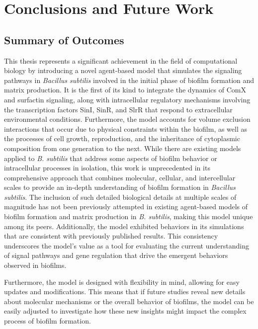 \chapter{Conclusions and Future Work}\label{chap:conclusion}

\section{Summary of Outcomes}\label{sec:summary_Ch7}
This thesis represents a significant achievement in the field of computational biology by introducing a novel agent-based model that simulates the signaling pathways in \textit{Bacillus subtilis} involved in the initial phase of biofilm formation and matrix production. It is the first of its kind to integrate the dynamics of ComX and surfactin signaling, along with intracellular regulatory mechanisms involving the transcription factors SinI, SinR, and SlrR that respond to extracellular environmental conditions. Furthermore, the model accounts for volume exclusion interactions that occur due to physical constraints within the biofilm, as well as the processes of cell growth, reproduction, and the inheritance of cytoplasmic composition from one generation to the next. While there are existing models applied to \textit{B. subtilis} that address some aspects of biofilm behavior or intracellular processes in isolation, this work is unprecedented in its comprehensive approach that combines molecular, cellular, and intercellular scales to provide an in-depth understanding of biofilm formation in \textit{Bacillus subtilis}. The inclusion of such detailed biological details at multiple scales of magnitude has not been previously attempted in existing agent-based models of biofilm formation and matrix production in \textit{B. subtilis}, making this model unique among its peers. Additionally, the model exhibited behaviors in its simulations that are consistent with previously published results. This consistency underscores the model's value as a tool for evaluating the current understanding of signal pathways and gene regulation that drive the emergent behaviors observed in biofilms.

Furthermore, the model is designed with flexibility in mind, allowing for easy updates and modifications. This means that if future studies reveal new details about molecular mechanisms or the overall behavior of biofilms, the model can be easily adjusted to investigate how these new insights might impact the complex process of biofilm formation.

